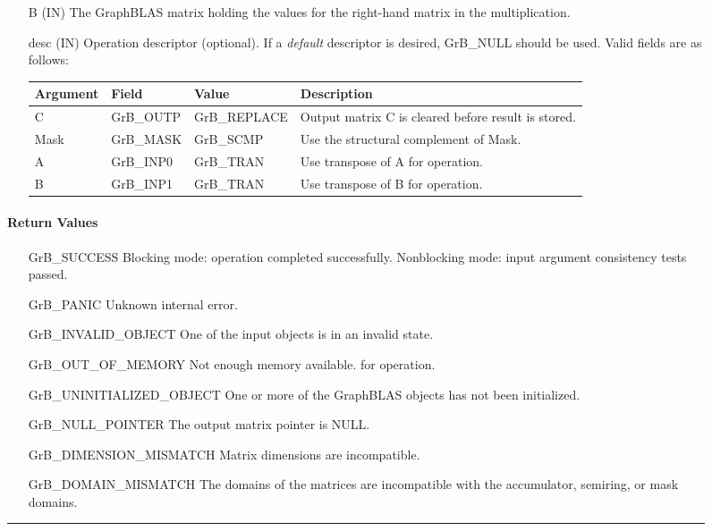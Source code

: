 \begin{figure*}[ht!]
\begin{itemize}[leftmargin=1.1in]
    \item[{\sf B}] ({\sf IN}) The GraphBLAS matrix holding the values
    for the right-hand matrix in the multiplication.

    \item[{\sf desc}] ({\sf IN}) Operation descriptor (optional). If
    a \emph{default} descriptor is desired, {\sf GrB\_NULL} should be
    used. Valid fields are as follows: 

    \begin{tabular}{lllp{2.75in}}
    Argument   & Field           & Value               & Description \\ \hline
    {\sf C}    & {\sf GrB\_OUTP} & {\sf GrB\_REPLACE}  & Output matrix {\sf C} is cleared before result is stored. \\
    {\sf Mask} & {\sf GrB\_MASK} & {\sf GrB\_SCMP}     & Use the structural complement of {\sf Mask}. \\
    {\sf A}    & {\sf GrB\_INP0} & {\sf GrB\_TRAN}     & Use transpose of {\sf A} for operation. \\
    {\sf B}    & {\sf GrB\_INP1} & {\sf GrB\_TRAN}     & Use transpose of {\sf B} for operation. \\
    \end{tabular}
\end{itemize}

\paragraph{Return Values}

\begin{itemize}[leftmargin=2.1in]

	\item[{\sf GrB\_SUCCESS}]	Blocking mode: operation
	completed successfully. Nonblocking mode: input argument consistency tests
	passed.  

	\item[{\sf GrB\_PANIC}]		      Unknown internal error.
    \item[{\sf GrB\_INVALID\_OBJECT}] One of the input objects is in an invalid state.
	\item[{\sf GrB\_OUT\_OF\_MEMORY}]	      Not enough memory available.
	for operation.
    \item[{\sf GrB\_UNINITIALIZED\_OBJECT}]  One or more of the GraphBLAS 
    objects has not been initialized.
    \item[{\sf GrB\_NULL\_POINTER}]  The output matrix pointer is {\sf NULL}.

	\item[{\sf GrB\_DIMENSION\_MISMATCH}] Matrix dimensions are
	incompatible.

	\item[{\sf GrB\_DOMAIN\_MISMATCH}]    The domains of the matrices are incompatible with the 
	accumulator, semiring, or mask domains.

\end{itemize}

\hrule
\end{figure*}
